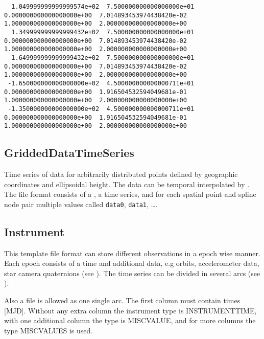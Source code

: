 \begin{verbatim}
  1.049999999999999574e+02  7.500000000000000000e+01  0.000000000000000000e+00  7.014893453974438420e-02  1.000000000000000000e+00  2.000000000000000000e+00
  1.349999999999999432e+02  7.500000000000000000e+01  0.000000000000000000e+00  7.014893453974438420e-02  1.000000000000000000e+00  2.000000000000000000e+00
  1.649999999999999432e+02  7.500000000000000000e+01  0.000000000000000000e+00  7.014893453974438420e-02  1.000000000000000000e+00  2.000000000000000000e+00
 -1.650000000000000000e+02  4.500000000000000711e+01  0.000000000000000000e+00  1.916504532594049681e-01  1.000000000000000000e+00  2.000000000000000000e+00
 -1.350000000000000000e+02  4.500000000000000711e+01  0.000000000000000000e+00  1.916504532594049681e-01  1.000000000000000000e+00  2.000000000000000000e+00
\end{verbatim}



\subsection{GriddedDataTimeSeries}\label{general.fileFormat:griddedDataTimeSeries}
Time series of data for arbitrarily distributed points defined by geographic coordinates and ellipsoidal
height. The data can be temporal interpolated by .
The file format consists of a , a time series, and
for each spatial point and spline node pair multiple values called \verb|data0|, \verb|data1|, \ldots.


\subsection{Instrument}\label{general.fileFormat:instrument}
This template file format can store different observations in a epoch wise manner. Each epoch consists of a time and
additional data, e.g orbits, accelerometer data, star camera quaternions (see ).
The time series can be divided in several arcs (see ).

Also a  file is allowed as one single arc. The first column must contain times [MJD]. Without any extra column
the instrument type is INSTRUMENTTIME, with one additional column the type is MISCVALUE, and for more columns the type
MISCVALUES is used.

